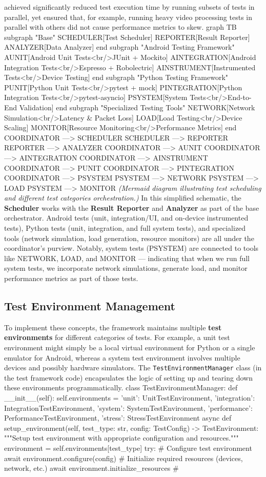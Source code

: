 achieved significantly reduced test execution time by running subsets of tests in parallel, yet ensured that, for example, running heavy video processing tests in parallel with others did not cause performance metrics to skew. graph TB subgraph "Base" SCHEDULER[Test Scheduler] REPORTER[Result Reporter] ANALYZER[Data Analyzer] end subgraph "Android Testing Framework" AUNIT[Android Unit Tests<br/>JUnit + Mockito] AINTEGRATION[Android Integration Tests<br/>Espresso + Robolectric] AINSTRUMENT[Instrumented Tests<br/>Device Testing] end subgraph "Python Testing Framework" PUNIT[Python Unit Tests<br/>pytest + mock] PINTEGRATION[Python Integration Tests<br/>pytest-asyncio] PSYSTEM[System Tests<br/>End-to-End Validation] end subgraph "Specialized Testing Tools" NETWORK[Network Simulation<br/>Latency \& Packet Loss] LOAD[Load Testing<br/>Device Scaling] MONITOR[Resource Monitoring<br/>Performance Metrics] end COORDINATOR ---> SCHEDULER SCHEDULER ---> REPORTER REPORTER ---> ANALYZER COORDINATOR ---> AUNIT COORDINATOR ---> AINTEGRATION COORDINATOR ---> AINSTRUMENT COORDINATOR ---> PUNIT COORDINATOR ---> PINTEGRATION COORDINATOR ---> PSYSTEM PSYSTEM ---> NETWORK PSYSTEM ---> LOAD PSYSTEM ---> MONITOR \textit{(Mermaid diagram illustrating test scheduling and different test categories orchestration.)} In this simplified schematic, the \textbf{Scheduler} works with the \textbf{Result Reporter} and \textbf{Analyzer} as part of the base orchestrator. Android tests (unit, integration/UI, and on-device instrumented tests), Python tests (unit, integration, and full system tests), and specialized tools (network simulation, load generation, resource monitors) are all under the coordinator's purview. Notably, system tests (PSYSTEM) are connected to tools like NETWORK, LOAD, and MONITOR --- indicating that when we run full system tests, we incorporate network simulations, generate load, and monitor performance metrics as part of those tests. \subsection{Test Environment Management} To implement these concepts, the framework maintains multiple \textbf{test environments} for different categories of tests. For example, a unit test environment might simply be a local virtual environment for Python or a single emulator for Android, whereas a system test environment involves multiple devices and possibly hardware simulators. The \texttt{TestEnvironmentManager} class (in the test framework code) encapsulates the logic of setting up and tearing down these environments programmatically. class TestEnvironmentManager: def __init__(self): self.environments = { 'unit': UnitTestEnvironment, 'integration': IntegrationTestEnvironment, 'system': SystemTestEnvironment, 'performance': PerformanceTestEnvironment, 'stress': StressTestEnvironment } async def setup_environment(self, test_type: str, config: TestConfig) -> TestEnvironment: """Setup test environment with appropriate configuration and resources.""" environment = self.environments[test_type] try: # Configure test environment await environment.configure(config) # Initialize required resources (devices, network, etc.) await environment.initialize_resources # 